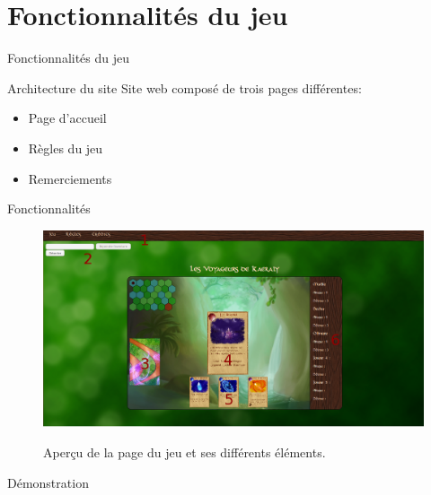 \documentclass{bredelebeamer}
\begin{document}
\section{Fonctionnalités du jeu}

\begin{frame}{Fonctionnalités du jeu}
 \begin{block}{Architecture du site}
 \pause
  Site web composé de trois pages différentes:
   \begin{itemize}
     \item Page d'accueil
     \item Règles du jeu
     \item Remerciements
   \end{itemize}
 \end{block}
\end{frame}

\begin{frame}{Fonctionnalités}
\begin{figure}[h!]
			\centering
			\includegraphics[scale=0.25]{manual.png}
			\label{fig:manual}
			\caption{Aperçu de la page du jeu et ses différents éléments.}
		\end{figure}
  \end{frame}
   \begin{frame}{Démonstration}
  \end{frame}
%
%
%
%
%
%
%
%
\end{document}
